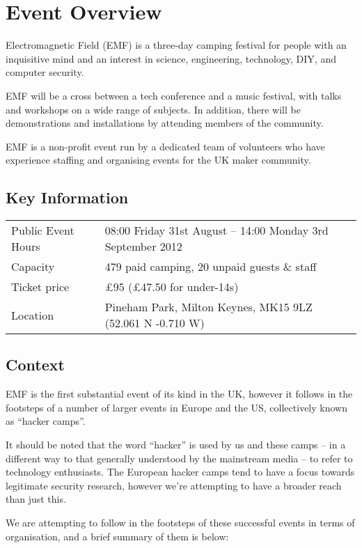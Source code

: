 \section{Event Overview}

Electromagnetic Field (EMF) is a three-day camping festival for people
with an inquisitive mind and an interest in science, engineering,
technology, DIY, and computer security. 

EMF will be a cross between a tech conference and a music festival, with talks and workshops on a wide
range of subjects. In addition, there will be demonstrations and installations by attending
members of the community.

EMF is a non-profit event run by a dedicated team of volunteers who have
experience staffing and organising events for the UK maker community.

\subsection{Key Information}

\begin{tabular}{ l l }
Public Event Hours & 08:00 Friday 31st August -- 14:00 Monday 3rd September 2012 \\
Capacity & 479 paid camping, 20 unpaid guests \& staff \\
Ticket price & £95 (£47.50 for under-14s) \\
Location & Pineham Park, Milton Keynes, MK15 9LZ (52.061 N -0.710 W) \\
\end{tabular}

\subsection{Context}

EMF is the first substantial event of its kind in the UK, however it
follows in the footsteps of a number of larger events in Europe and the
US, collectively known as ``hacker camps''.

It should be noted that the word ``hacker'' is used by us and these camps
-- in a different way to that generally understood by the
mainstream media -- to refer to technology enthusiasts. The European
hacker camps tend to have a focus towards legitimate security research,
however we're attempting to have a broader reach than just this.

We are attempting to follow in the footsteps of these successful events
in terms of organisation, and a brief summary of them is below:

